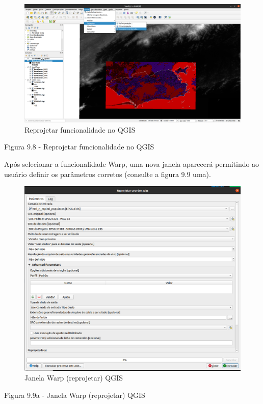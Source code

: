 \documentclass[
  portuguese,
]{krantz}
\begin{document}
\begin{figure}
\centering
\includegraphics{media/modulo9/fig98.png}
\caption{Reprojetar funcionalidade no QGIS}
\end{figure}

Figura 9.8 - Reprojetar funcionalidade no QGIS

Após selecionar a funcionalidade Warp, uma nova janela aparecerá permitindo ao usuário definir os parâmetros corretos (consulte a figura 9.9 uma).

\begin{figure}
\centering
\includegraphics{media/modulo9/fig99_a.png}
\caption{Janela Warp (reprojetar) QGIS}
\end{figure}

Figura 9.9a - Janela Warp (reprojetar) QGIS
\end{document}

